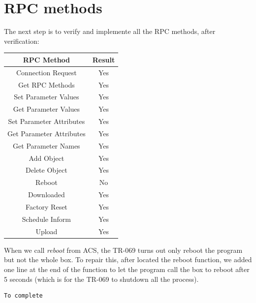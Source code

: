 \section{RPC methods}
The next step is to verify and implemente all the RPC methods, after verification:
\begin{center}
  \begin{tabular}{@{} cc @{}}
    \toprule
    RPC Method & Result \\*
    \midrule
    Connection Request & Yes \\
    Get RPC Methods & Yes \\
    Set Parameter Values  & Yes\\
    Get Parameter Values  & Yes\\
    Set Parameter Attributes  & Yes\\
    Get Parameter Attributes  & Yes\\
    Get Parameter Names & Yes\\
    Add Object  & Yes\\
    Delete Object & Yes\\
    Reboot & No\\
    Downloaded  & Yes\\
    Factory Reset & Yes\\
    Schedule Inform & Yes\\
    Upload & Yes\\
    \bottomrule
  \end{tabular}
\end{center}

When we call \textit{reboot} from ACS, the TR-069 turns out only reboot the program but not the whole box. To repair this, after located the reboot function, we added one line at the end of the function to let the program call the box to reboot after 5 seconds (which is for the TR-069 to shutdown all the process).
\begin{lstlisting}[mathescape]
  To complete
\end{lstlisting}
